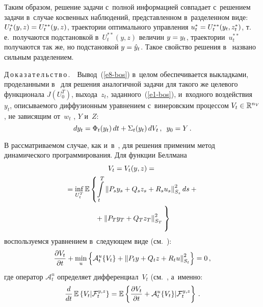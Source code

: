 \begin{multicols}{2}
\smallskip

     Таким образом, решение задачи с~полной информацией совпадает 
с~решением задачи в~случае косвенных наблюдений, представленном 
в~разделенном виде: $U_t^*(y,z)\hm= U_t^{**}(y,z)$, траектории 
оптимального управления $u_t^*\hm= U_t^{**}(y_t, z_t^*)$, т.\,е.\ 
получаются подстановкой в~$U_t^{**}(y,z)$ величин $y\hm= y_t$, 
траектории~$u_t^{**}$ получаются так же, но подстановкой $y\hm= 
\hat{y}_t$. Такое свойство решения в~\cite{9-bos} названо сильным 
разделением.
     
\smallskip

\noindent
Д\,о\,к\,а\,з\,а\,т\,е\,л\,ь\,с\,т\,в\,о\,.\ \ Вывод~(\ref{e8-bos}) в~целом 
обеспечивается выкладками, проделанными в~\cite{3-bos} для решения 
аналогичной задачи для такого же целевого функционала $J(U_0^T)$, 
выхода~$z_t$, заданного~(\ref{e1-bos}), и~входного воздействия~$y_t$, 
описываемого диффузионным уравнением с~винеровским процессом 
$V_t\hm\in \mathbb{R}^{n_V}$, не зависящим от~$w_t$ , $Y$ и~$Z$:
\begin{equation}
dy_t = \Phi_t(y_t) \,dt+ \Sigma_t(y_t) \,dV_t\,,\enskip y_0=Y\,.
\label{e9-bos}
\end{equation}

     
     В рассматриваемом случае, как и~в~\cite{3-bos}, для решения 
применим метод динамического программирования. Для функции Беллмана
     \begin{multline*}
     V_t= V_t(y,z) ={}\\
     {}= \mathop{\mathrm{inf}}\limits_{U_t^T} \mathbb{E}\left\{ 
\int\limits_t^T \left\| P_s y_s +Q_s z_s +R_s u_s\right\|^2_{S_s} ds +{}\right.\\
\left.{}+
     \left\| P_T y_T +Q_T z_T \right\|^2_{S_T}
     \vphantom{\int\limits_t^T}\right\}
     \end{multline*}
воспользуемся уравнением в~следующем виде (см.~\cite[гл.~6, \S\,2]{6-bos}):
$$
\displaystyle\frac{\displaystyle \partial V_t\mathstrut}{\displaystyle \partial t\mathstrut} +\min\limits_u \left\{ \mathcal{A}_t^u \{V_t\}+\left\| P_t y 
+Q_t z + R_t u\right\|^2_{S_t}\right\} =0\,,
$$
где оператор $\mathcal{A}_t^u$ определяет  
дифференциал~$V_t$ (см.~\cite[гл.~5, \S\,5]{6-bos}, а~именно:
$$
\displaystyle\frac{\displaystyle d\mathstrut}{\displaystyle dt\mathstrut}\,\mathbb{E}\left\{ V_t\vert \mathcal{F}_t^{y,z}\right\} =\mathbb{E}\left\{
\displaystyle\frac{\displaystyle \partial V_t\mathstrut}{\displaystyle \partial t\mathstrut} +\mathcal{A}_t^u\{V_t\}\vert \mathcal{F}_t^{y,z}\right\}\,.
$$
     

\end{multicols}
